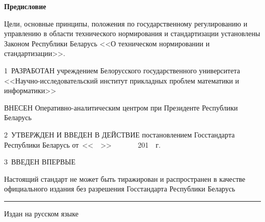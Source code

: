 \centerline{\bf Предисловие} 
Цели, основные принципы, положения по государственному регулированию и управлению в 
области технического нормирования и стандартизации установлены Законом 
Республики Беларусь <<О техническом нормировании и стандартизации>>. 

\vskip0.2cm

1~РАЗРАБОТАН учреждением Белорусского государственного университета 
<<Научно-исследовательский  институт прикладных проблем математики и 
информатики>>

ВНЕСЕН Оперативно-аналитическим центром при Президенте 
Республики Беларусь

2~УТВЕРЖДЕН И ВВЕДЕН В ДЕЙСТВИЕ постановлением Госстандарта Республики 
Беларусь от~<<$\phantom{\text{09}}$>>       
$\phantom{\text{января}}$~201$\phantom{\text{8}}$~г. 
\No~$\phantom{\text{9}}$ 

3~ВВЕДЕН ВПЕРВЫЕ

\vfill

Настоящий стандарт не может быть тиражирован и распространен в качестве 
официального издания без разрешения Госстандарта Республики Беларусь

\hrule
\vskip1mm
Издан на русском языке

\pagebreak

\pagebreak
